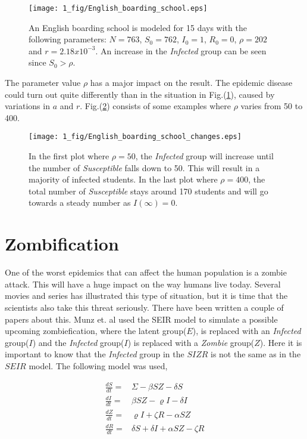 \documentclass[%
twoside,                 %
final,                   %
chapterprefix=true,      %
open=right               %
10pt]{book}
\begin{document}
\begin{figure}[ht]
  \centerline{\texttt{[image: 1\_fig/English\_boarding\_school.eps]}}
  \caption{
  \label{fig:english_boarding} An English boarding school is modeled for 15 days with the following parameters: $N=763$, $S_0=762$, $I_0=1$, $R_0=0$, $\rho=202$ and $r=2.18 x 10^{-3}$. An increase in the \emph{Infected} group can be seen since $S_0 > \rho$.
  }
\end{figure}


The parameter value $\rho$ has a major impact on the result. The epidemic disease could turn out quite differently than in the situation in Fig.(\ref{fig:english_boarding}), caused by variations in $a$ and $r$. Fig.(\ref{fig:rho_changes}) consists of some examples where $\rho$ varies from 50 to 400.


\begin{figure}[ht]
  \centerline{\texttt{[image: 1\_fig/English\_boarding\_school\_changes.eps]}}
  \caption{
  \label{fig:rho_changes} In the first plot where $\rho=50$, the \emph{Infected} group will increase until the number of \emph{Susceptible} falls down to 50. This will result in a majority of infected students. In the last plot where $\rho=400$, the total number of \emph{Susceptible} stays around 170 students and will go towards a steady number as $I(\infty)=0$.
  }
\end{figure}


\section{Zombification}
One of the worst epidemics that can affect the human population is a zombie attack. This will have a huge impact on the way humans live today. Several movies and series has illustrated this type of situation, but it is time that the scientists also take this threat seriously. There have been written a couple of papers about this. Munz et. al\cite{munz2009zombies} used the SEIR model to simulate a possible upcoming zombiefication, where the latent group($E$), is replaced with an \emph{Infected} group($I$) and the \emph{Infected} group($I$) is replaced with a \emph{Zombie} group($Z$). Here it is important to know that the \emph{Infected} group in the $SIZR$ is not the same as in the $SEIR$ model. The following model was used,

\begin{align*}
\frac{dS}{dt} =& \Sigma -\beta SZ - \delta S \\
\frac{dI}{dt} =& \beta SZ - \varrho I - \delta I\\
\frac{dZ}{dt} =& \varrho I + \zeta R - \alpha SZ\\
\frac{dR}{dt} =& \delta S + \delta I + \alpha SZ - \zeta R
\end{align*}
\end{document}
